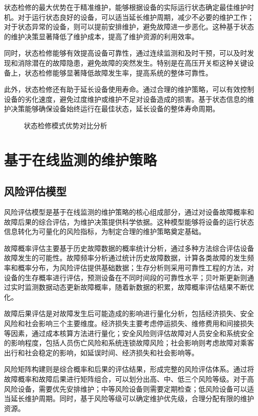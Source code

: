 状态检修的最大优势在于精准维护，能够根据设备的实际运行状态确定最佳维护时机。对于运行状态良好的设备，可以适当延长维护周期，减少不必要的维护工作；对于状态异常的设备，则可以提前安排维护，避免故障进一步恶化。这种基于状态的维护决策显著降低了维护成本，提高了维护资源的利用效率。

同时，状态检修能够有效提高设备可靠性，通过连续监测和及时干预，可以及时发现和消除潜在的故障隐患，避免故障的突然发生。特别是在高压开关柜这种关键设备上，状态检修能够显著降低故障发生率，提高系统的整体可靠性。

此外，状态检修还有助于延长设备使用寿命。通过合理的维护策略，可以有效控制设备的劣化速度，避免过度维护或维护不足对设备造成的损害。基于状态信息的维护决策能够确保设备始终运行在最佳状态，延长设备的整体寿命周期。

\begin{figure}[h]
\centering
\caption{状态检修模式优势对比分析}
\label{fig:cbm_advantages}
\end{figure}

\section{基于在线监测的维护策略}

\subsection{风险评估模型}

风险评估模型是基于在线监测的维护策略的核心组成部分，通过对设备故障概率和故障后果的综合评估，为维护决策提供科学依据。这种模型能够将设备的运行状态信息转化为可量化的风险指标，为制定合理的维护策略奠定基础。

故障概率评估主要基于历史故障数据的概率统计分析，通过多种方法综合评估设备故障发生的可能性。故障频率分析通过统计历史故障数据，计算各类故障的发生频率和概率分布，为风险评估提供基础数据；生存分析则采用可靠性工程的方法，对设备的生存概率进行评估，预测设备在不同时间段的可靠性水平；贝叶斯更新则通过实时监测数据动态更新故障概率，随着新数据的积累，故障概率评估结果不断优化。

故障后果评估是对故障发生后可能造成的影响进行量化分析，包括经济损失、安全风险和社会影响三个主要维度。经济损失主要考虑停运损失、维修费用和间接损失等因素，通过成本核算方法进行量化；安全风险则评估故障对人员安全和系统安全的影响程度，包括人员伤亡风险和系统连锁故障风险；社会影响则考虑故障对乘客出行和社会稳定的影响，如延误时间、经济损失和社会影响等。

风险矩阵构建则是综合概率和后果的评估结果，形成完整的风险评估体系。通过将故障概率和故障后果进行矩阵组合，可以划分出高、中、低三个风险等级。对于高风险设备，需要优先安排维护；中等风险设备则需要定期检查；低风险设备可以适当延长维护周期。同时，基于风险等级可以确定维护优先级，合理分配有限的维护资源。

